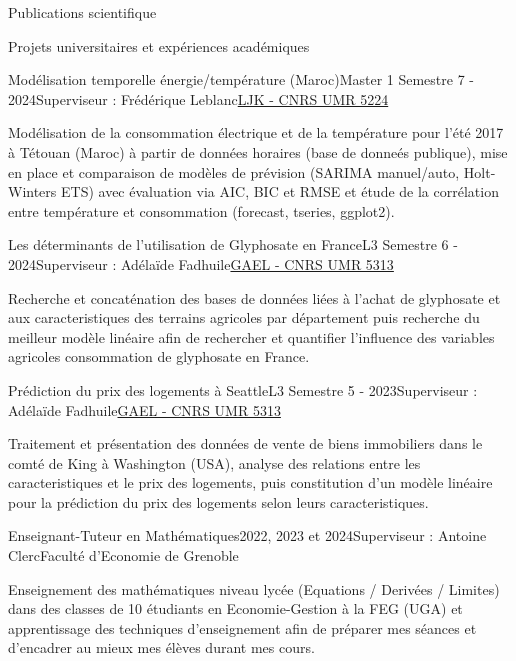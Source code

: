 \documentclass[11pt,]{resume}
\begin{document}
\begin{rSection}{Publications scientifique}
\begin{rSection}{Projets universitaires et expériences académiques}
	\begin{rSubsection}{Modélisation temporelle énergie/température (Maroc)}{Master 1 Semestre 7 - 2024}{Superviseur : Frédérique Leblanc}{\href{https://www-ljk.imag.fr/}{LJK - CNRS UMR 5224}}
		\item Modélisation de la consommation électrique et de la température pour l'été 2017 à Tétouan (Maroc) à partir de données horaires (base de donneés publique), mise en place et comparaison de modèles de prévision (SARIMA manuel/auto, Holt-Winters ETS) avec évaluation via AIC, BIC et RMSE et étude de la corrélation entre température et consommation (forecast, tseries, ggplot2).
	\end{rSubsection}

	\begin{rSubsection}{Les déterminants de l'utilisation de Glyphosate en France}{L3 Semestre 6 - 2024}{Superviseur : Adélaïde Fadhuile}{\href{https://gael.univ-grenoble-alpes.fr/fr}{GAEL - CNRS UMR 5313}}
		\item Recherche et concaténation des bases de données liées à l'achat de glyphosate et aux caracteristiques des terrains agricoles par département puis recherche du meilleur modèle linéaire afin de rechercher et quantifier l'influence des variables agricoles consommation de glyphosate en France.
	\end{rSubsection}

	\begin{rSubsection}{Prédiction du prix des logements à Seattle}{L3 Semestre 5 - 2023}{Superviseur : Adélaïde Fadhuile}{\href{https://gael.univ-grenoble-alpes.fr/fr}{GAEL - CNRS UMR 5313}}
		\item Traitement et présentation des données de vente de biens immobiliers dans le comté de King à Washington (USA), analyse des relations entre les caracteristiques et le prix des logements, puis constitution d'un modèle linéaire pour la prédiction du prix des logements selon leurs caracteristiques.
	\end{rSubsection}

	\begin{rSubsection}{Enseignant-Tuteur en Mathématiques}{2022, 2023 et 2024}{Superviseur : Antoine Clerc}{Faculté d'Economie de Grenoble}
		\item Enseignement des mathématiques niveau lycée (Equations / Derivées / Limites) dans des classes de 10 étudiants en Economie-Gestion à la FEG (UGA) et apprentissage des techniques d'enseignement afin de préparer mes séances et d'encadrer au mieux mes élèves durant mes cours.
	\end{rSubsection}


\end{rSection}
\end{rSection}
\end{document}
